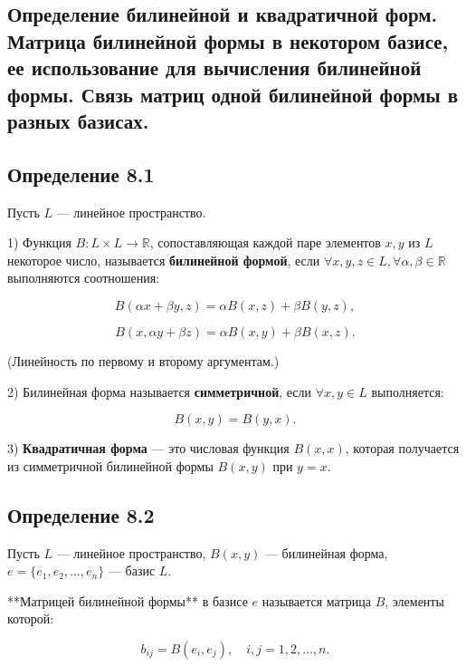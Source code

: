 {
\subsection{Определение билинейной и квадратичной форм. Матрица билинейной формы в некотором базисе, ее использование для вычисления билинейной формы. Связь матриц одной билинейной формы в разных базисах.}

\subsection*{Определение 8.1}

Пусть \( L \) — линейное пространство.

1) Функция \( B: L \times L \to \mathbb{R} \), сопоставляющая каждой паре элементов \( x, y \) из \( L \) некоторое число, называется \textbf{билинейной формой}, если \( \forall x, y, z \in L, \forall \alpha, \beta \in \mathbb{R} \) выполняются соотношения:



\[
B(\alpha x + \beta y, z) = \alpha B(x, z) + \beta B(y, z),
\]





\[
B(x, \alpha y + \beta z) = \alpha B(x, y) + \beta B(x, z).
\]



(Линейность по первому и второму аргументам.)

2) Билинейная форма называется \textbf{симметричной}, если \( \forall x, y \in L \) выполняется:



\[
B(x, y) = B(y, x).
\]



3) \textbf{Квадратичная форма} — это числовая функция \( B(x, x) \), которая получается из симметричной билинейной формы \( B(x, y) \) при \( y = x \).

\subsection*{Определение 8.2}

Пусть \( L \) — линейное пространство, \( B(x, y) \) — билинейная форма, \( e = \{e_1, e_2, \dots, e_n\} \) — базис \( L \).

**Матрицей билинейной формы** в базисе \( e \) называется матрица \( B \), элементы которой:



\[
b_{ij} = B(e_i, e_j), \quad i, j = 1, 2, \dots, n.
\]



}
